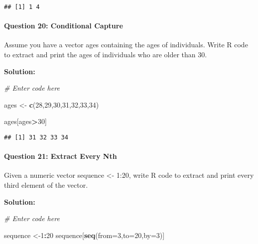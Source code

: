 \documentclass[
]{article}
\newenvironment{Shaded}{\begin{snugshade}}{\end{snugshade}}
\newcommand{\AttributeTok}[1]{\textcolor[rgb]{0.13,0.29,0.53}{#1}}
\newcommand{\CommentTok}[1]{\textcolor[rgb]{0.56,0.35,0.01}{\textit{#1}}}
\newcommand{\DecValTok}[1]{\textcolor[rgb]{0.00,0.00,0.81}{#1}}
\newcommand{\FunctionTok}[1]{\textcolor[rgb]{0.13,0.29,0.53}{\textbf{#1}}}
\newcommand{\NormalTok}[1]{#1}
\newcommand{\OtherTok}[1]{\textcolor[rgb]{0.56,0.35,0.01}{#1}}
\newcommand{\SpecialCharTok}[1]{\textcolor[rgb]{0.81,0.36,0.00}{\textbf{#1}}}
\begin{document}
\begin{verbatim}
## [1] 1 4
\end{verbatim}

\hypertarget{question-20-conditional-capture}{%
\paragraph{Question 20: Conditional
Capture}\label{question-20-conditional-capture}}

Assume you have a vector ages containing the ages of individuals. Write
R code to extract and print the ages of individuals who are older than
30.

\textbf{Solution:}

\begin{Shaded}
\begin{Highlighting}[]
\CommentTok{\# Enter code here}

\NormalTok{ages }\OtherTok{\textless{}{-}} \FunctionTok{c}\NormalTok{(}\DecValTok{28}\NormalTok{,}\DecValTok{29}\NormalTok{,}\DecValTok{30}\NormalTok{,}\DecValTok{31}\NormalTok{,}\DecValTok{32}\NormalTok{,}\DecValTok{33}\NormalTok{,}\DecValTok{34}\NormalTok{)}

\NormalTok{ages[ages}\SpecialCharTok{\textgreater{}}\DecValTok{30}\NormalTok{]}
\end{Highlighting}
\end{Shaded}

\begin{verbatim}
## [1] 31 32 33 34
\end{verbatim}

\hypertarget{question-21-extract-every-nth}{%
\paragraph{Question 21: Extract Every
Nth}\label{question-21-extract-every-nth}}

Given a numeric vector sequence \textless- 1:20, write R code to extract
and print every third element of the vector.

\textbf{Solution:}

\begin{Shaded}
\begin{Highlighting}[]
\CommentTok{\# Enter code here}

\NormalTok{sequence }\OtherTok{\textless{}{-}}\DecValTok{1}\SpecialCharTok{:}\DecValTok{20}
\NormalTok{sequence[}\FunctionTok{seq}\NormalTok{(}\AttributeTok{from=}\DecValTok{3}\NormalTok{,}\AttributeTok{to=}\DecValTok{20}\NormalTok{,}\AttributeTok{by=}\DecValTok{3}\NormalTok{)]}
\end{Highlighting}
\end{Shaded}
\end{document}
